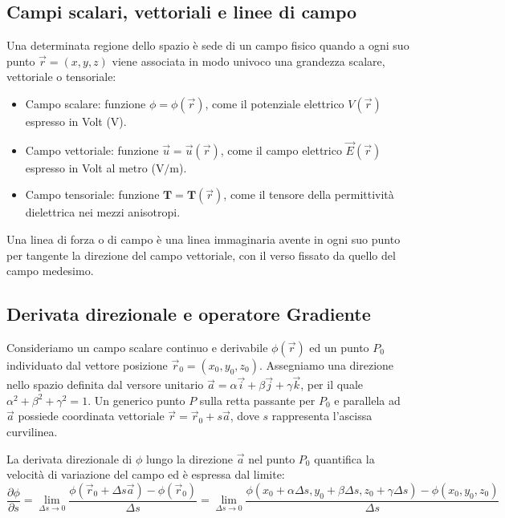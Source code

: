 \documentclass[12pt, a4paper]{article}
\begin{document}
	\subsection{Campi scalari, vettoriali e linee di campo}
	
	Una determinata regione dello spazio è sede di un campo fisico quando a ogni suo punto $\vec{r} = (x, y, z)$ viene associata in modo univoco una grandezza scalare, vettoriale o tensoriale:
	\begin{itemize}
		\item Campo scalare: funzione $\phi = \phi(\vec{r})$, come il potenziale elettrico $V(\vec{r})$ espresso in Volt ($\text{V}$).
		\item Campo vettoriale: funzione $\vec{u} = \vec{u}(\vec{r})$, come il campo elettrico $\vec{E}(\vec{r})$ espresso in Volt al metro ($\text{V/m}$).
		\item Campo tensoriale: funzione $\mathbf{T} = \mathbf{T}(\vec{r})$, come il tensore della permittività dielettrica nei mezzi anisotropi.
	\end{itemize}
	
	Una linea di forza o di campo è una linea immaginaria avente in ogni suo punto per tangente la direzione del campo vettoriale, con il verso fissato da quello del campo medesimo.
	
	\subsection{Derivata direzionale e operatore Gradiente}
	
	Consideriamo un campo scalare continuo e derivabile $\phi(\vec{r})$ ed un punto $P_0$ individuato dal vettore posizione $\vec{r}_0 = (x_0, y_0, z_0)$. Assegniamo una direzione nello spazio definita dal versore unitario $\vec{a} = \alpha \vec{i} + \beta \vec{j} + \gamma \vec{k}$, per il quale $\alpha^2 + \beta^2 + \gamma^2 = 1$.
	Un generico punto $P$ sulla retta passante per $P_0$ e parallela ad $\vec{a}$ possiede coordinata vettoriale $\vec{r} = \vec{r}_0 + s \vec{a}$, dove $s$ rappresenta l'ascissa curvilinea.
	
	La derivata direzionale di $\phi$ lungo la direzione $\vec{a}$ nel punto $P_0$ quantifica la velocità di variazione del campo ed è espressa dal limite:
	\[
	\frac{\partial \phi}{\partial s} = \lim_{\Delta s \to 0} \frac{\phi(\vec{r}_0 + \Delta s \vec{a}) - \phi(\vec{r}_0)}{\Delta s} = \lim_{\Delta s \to 0} \frac{\phi(x_0+\alpha\Delta s, y_0+\beta\Delta s, z_0+\gamma\Delta s) - \phi(x_0, y_0, z_0)}{\Delta s}
	\]
	
\end{document}
